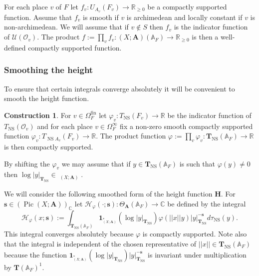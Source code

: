 \documentclass[a4paper,11pt,reqno]{amsart}
\newcommand{\R}{\mathbb{R}}
\newcommand{\C}{\mathbb{C}}
\newcommand{\A}{\mathbb{A}}
\DeclareMathOperator{\Pic}{Pic}
\DeclareMathOperator{\NS}{NS}
\DeclareMathOperator{\Eff}{\overline{Eff}}
\theoremstyle{definition}
\newtheorem{construction}[theorem]{Construction}
\begin{document}
For each place $v$ of $F$ let $f_v: U_{A_v}(F_v) \to \R_{\geq 0}$ be a compactly supported function. Assume that $f_v$ is smooth if $v$ is archimedean and locally constant if $v$ is non-archimedean. We will assume that if $v \not \in S$ then $f_v$ is the indicator function of $\mathcal{U}(\mathcal{O}_{v})$. The product $f := \prod_v f_v: (X; \mathbf{A})(\A_F) \to \R_{\geq 0}$ is then a well-defined compactly supported function. 
\subsubsection{Smoothing the height}
To ensure that certain integrals converge absolutely it will be convenient to smooth the height function. 
\begin{construction}\label{cons:Mollifiers}
	For $v \in \Omega_F^{\text{fin}}$ let $\varphi_v: T_{\NS}(F_v) \to \R$ be the indicator function of $T_{\NS}(\mathcal{O}_v)$ and for each place $v \in \Omega_F^{\infty}$ fix a non-zero smooth compactly supported function $\varphi_v: T_{\NS A_v}(F_v) \to \R$. The product function $\varphi := \prod_v \varphi_v: \mathbf{T}_{\NS}(\A_F) \to \R$ is then compactly supported.
	
	By shifting the $\varphi_v$ we may assume that if $y \in \mathbf{T}_{\NS}(\A_F)$ is such that $\varphi(y) \neq 0$ then $\log |y|_{\mathbf{T}_{\NS}} \in \Eff_{(X ; \mathbf{A})}$. 
\end{construction}

We will consider the following smoothed form of the height function $\mathbf{H}$. For $\bm{s} \in (\Pic (X ; \mathbf{A}))_{\C}$ let $\mathcal{H}_{\varphi}(\cdot ; \bm{s}): \Theta_{\mathbf{A}}(\A_F) \to \C$ be defined by the integral
\begin{equation}
	\mathcal{H}_{\varphi}(x; \bm{s}) := \int_{\mathbf{T}_{\NS}(\A_F)} \mathbf{1}_{\Eff_{(X; \mathbf{A})}^*}(\log |y|_{\mathbf{T}_{\NS}}) \varphi(||x|| y) |y|_{\mathbf{T}_{\NS}}^{- \bm{s}} d \tau_{\NS}(y).
	\label{Definition of smoothed height}
\end{equation}
This integral converges absolutely because $\varphi$ is compactly supported. Note also that the integral is independent of the chosen representative of $||x|| \in \mathbf{T}_{\NS}(\A_F)$ because the function $\mathbf{1}_{\Eff_{(X; \mathbf{A})}^*}(\log |y|_{\mathbf{T}_{\NS}}) |y|_{\mathbf{T}_{\NS}}^{- \bm{s}}$ is invariant under multiplication by $\mathbf{T}(\A_F)^1$.
\end{document}
